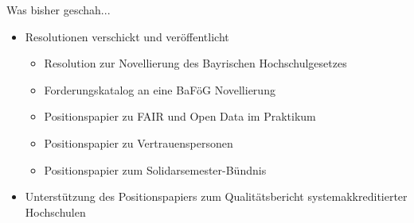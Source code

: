 \documentclass[compress, aspectratio=169]{beamer}
\begin{document}





\begin{frame}{Was bisher geschah...}
 \begin{itemize}
  \item Resolutionen verschickt und veröffentlicht
  \begin{itemize}
    \item Resolution zur Novellierung des Bayrischen Hochschulgesetzes
    \item Forderungskatalog an eine BaFöG Novellierung
    \item Positionspapier zu FAIR und Open Data im Praktikum
    \item Positionspapier zu Vertrauenspersonen
    \item Positionspapier zum Solidarsemester-Bündnis
   \end{itemize}
   \item Unterstützung des Positionspapiers zum Qualitätsbericht systemakkreditierter Hochschulen 
 \end{itemize}
\end{frame}
%
\end{document}
